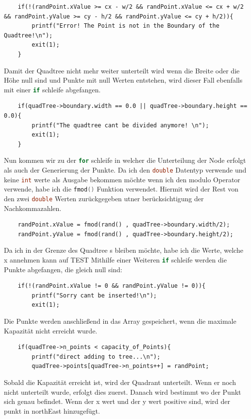 \documentclass[11pt]{article}
\newcommand{\qt}{Quadtree }
\newcommand{\lstin}[1]{\lstinline[language=C]{#1}}
\begin{document}
\begin{lstlisting}
    if(!(randPoint.xValue >= cx - w/2 && randPoint.xValue <= cx + w/2 && randPoint.yValue >= cy - h/2 && randPoint.yValue <= cy + h/2)){
        printf("Error! The Point is not in the Boundary of the Quadtree!\n");
        exit(1); 
    }
\end{lstlisting}
Damit der \qt nicht mehr weiter unterteilt wird wenn die Breite oder die Höhe null sind und  Punkte mit null Werten entstehen, wird dieser Fall ebenfalls mit einer \lstin{if} schleife abgefangen. 
\begin{lstlisting}
    if(quadTree->boundary.width == 0.0 || quadTree->boundary.height == 0.0){
        printf("The quadtree cant be divided anymore! \n");
        exit(1); 
    }
\end{lstlisting}
Nun kommen wir zu der \lstin{for} schleife in welcher die Unterteilung der Node erfolgt als auch der Generierung der Punkte.\newline
Da ich den \lstin{double} Datentyp verwende und keine \lstin{int} werte als Ausgabe bekommen möchte wenn ich den modulo Operator verwende, habe ich die \lstin{fmod()} Funktion verwendet. Hiermit wird der Rest von den zwei \lstin{double} Werten zurückgegeben utner berücksichtigung der Nachkommazahlen. 
\begin{lstlisting}
    randPoint.xValue = fmod(rand() , quadTree->boundary.width/2); 
    randPoint.yValue = fmod(rand() , quadTree->boundary.height/2); 
\end{lstlisting}
Da ich in der Grenze des \qt s bleiben möchte, habe ich die Werte, welche x annehmen kann auf TEST 
Mithilfe einer Weiteren \lstin{if} schleife werden die Punkte abgefangen, die gleich null sind: 
\begin{lstlisting}
    if(!(randPoint.xValue != 0 && randPoint.yValue != 0)){
        printf("Sorry cant be inserted!\n");
        exit(1);
\end{lstlisting}
Die Punkte werden anschließend in das Array gespeichert, wenn die maximale Kapazität nicht erreicht wurde. 
\begin{lstlisting}
    if(quadTree->n_points < capacity_of_Points){
        printf("direct adding to tree...\n");
        quadTree->points[quadTree->n_points++] = randPoint; 
\end{lstlisting}
Sobald die Kapazität erreicht ist, wird der Quadrant unterteilt. Wenn er noch nicht unterteilt wurde, erfolgt dies zuerst. Danach wird bestimmt wo der Punkt sich genau befindet. Wenn der x wert und der y wert positive sind, wird der punkt in northEast hinzugefügt.
\end{document}
